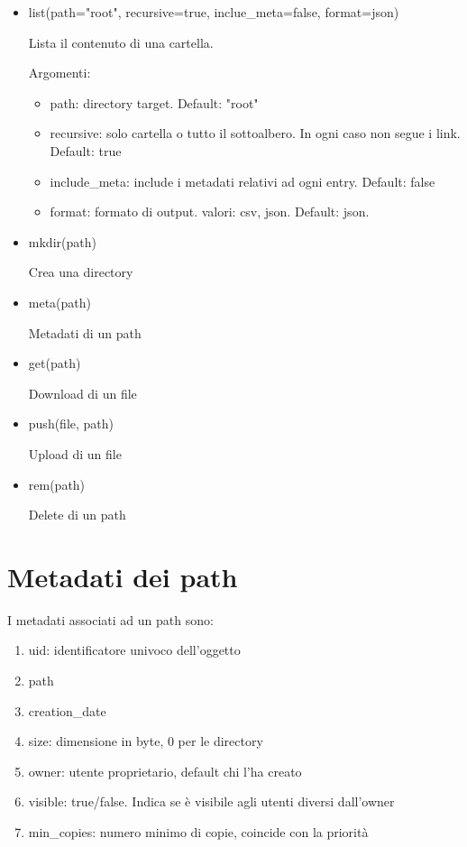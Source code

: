 \documentclass{article}
\begin{document}
\begin{itemize}
	\item list(path="root", recursive=true, inclue\_meta=false, format=json)
	
	Lista il contenuto di una cartella.
	
	Argomenti: \begin{itemize}
		\item path: directory target. Default: "root"
		\item recursive: solo cartella o tutto il sottoalbero. In ogni caso non segue i link. Default: true
		\item include\_meta: include i metadati relativi ad ogni entry. Default: false
		\item format: formato di output. valori: csv, json. Default: json.
	\end{itemize}
	
	\item mkdir(path)
	
	Crea una directory
	
	\item meta(path)
	
	Metadati di un path
	
	\item get(path)
	
	Download di un file
	
	\item push(file, path) 
	
	Upload di un file
	
	\item rem(path)
	
	Delete di un path 
\end{itemize}




\section{Metadati dei path}

I metadati associati ad un path sono: 

\begin{enumerate}
	\item uid: identificatore univoco dell'oggetto
	\item path
	\item creation\_date
	\item size: dimensione in byte, 0 per le directory
	\item owner: utente proprietario, default chi l'ha creato
	\item visible: true/false. Indica se è visibile agli utenti diversi dall'owner
	\item min\_copies: numero minimo di copie, coincide con la priorità 
\end{enumerate}
\end{document}
